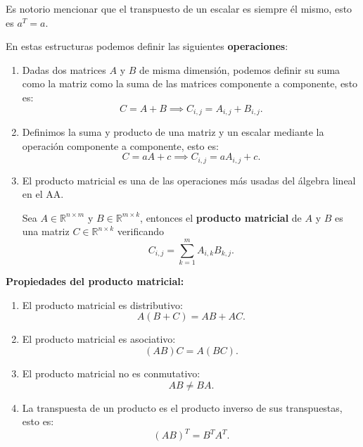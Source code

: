 Es notorio mencionar que el transpuesto de un escalar es siempre él mismo, esto es $a^T=a$.

En estas estructuras podemos definir las siguientes \textbf{operaciones}:
\begin{enumerate}
    \item Dadas dos matrices $A$ y $B$ de misma dimensión, podemos definir su suma como la matriz como la suma de las matrices componente a componente, esto es:
    \begin{equation}
        C = A + B \implies C_{i,j} = A_{i,j} + B_{i,j}.
    \end{equation}
    
    \item Definimos la suma y producto de una matriz y un escalar mediante la operación componente a componente, esto es:
    \begin{equation}
        C = aA + c \implies C_{i,j} = aA_{i,j} + c.
    \end{equation}

    \item El producto matricial es una de las operaciones más usadas del álgebra lineal en el \ac{AA}.
    \begin{definition}
        Sea $A \in \mathbb{R}^{n \times m}$ y $B \in \mathbb{R}^{m \times k}$, entonces el \textbf{producto matricial} de $A$ y $B$ es una matriz $C \in \mathbb{R}^{n\times k}$ verificando
        \begin{equation}
            C_{i,j} = \sum_{k=1}^{m} A_{i,k}B_{k,j}.
        \end{equation}
    \end{definition}
\end{enumerate}

\textbf{Propiedades del producto matricial:}
\begin{enumerate}
    \item El producto matricial es distributivo:
    \begin{equation}
        A(B+C)=AB+AC.
    \end{equation}
    \item El producto matricial es asociativo:
    \begin{equation}
        (AB)C = A(BC).
    \end{equation}
    \item El producto matricial no es conmutativo:
    \begin{equation}
        AB \ne BA.
    \end{equation}
    \item La transpuesta de un producto es el producto inverso de sus transpuestas, esto es:
    \begin{equation}
        (AB)^T = B^T A^T.
    \end{equation}
\end{enumerate}

